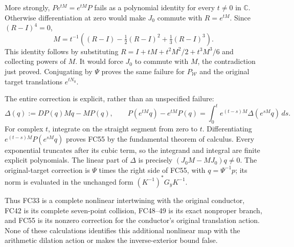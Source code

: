 \documentclass[11pt]{article}
\newcommand{\C}{\mathbb C}
\begin{document}
More strongly, $P e^{tM}=e^{tM}P$ fails as a polynomial identity
for every $t\ne0$ in $\C$. Otherwise differentiation at zero
would make $J_0$ commute with $R=e^{tM}$. Since $(R-I)^4=0$,
\[
 M=t^{-1}\left((R-I)-\tfrac12(R-I)^2+\tfrac13(R-I)^3\right).
\]
This identity follows by substituting
$R=I+tM+t^2M^2/2+t^3M^3/6$ and collecting powers of $M$.
It would force $J_0$ to commute with $M$, the contradiction just
proved. Conjugating by $\Psi$ proves the same failure for
$P_{\mathcal W}$ and the original target translations $e^{tN_0}$.

The entire correction is explicit, rather than an unspecified failure:
\[
 \Delta(q):=DP(q)Mq-MP(q),\qquad
 P(e^{tM}q)-e^{tM}P(q)
 =\int_0^t e^{(t-s)M}\Delta(e^{sM}q)\,ds.
 \tag{FC55}
\]
For complex $t$, integrate on the straight segment from zero to $t$.
Differentiating $e^{(t-s)M}P(e^{sM}q)$ proves FC55 by the
fundamental theorem of calculus. Every exponential truncates after
its cubic term, so the integrand and integral are finite explicit
polynomials. The linear part of $\Delta$ is precisely
$(J_0M-MJ_0)q\ne0$. The original-target correction is
$\Psi$ times the right side of FC55, with $q=\Psi^{-1}p$;
its norm is evaluated in the unchanged form
$(K^{-1})^*G_yK^{-1}$.

Thus FC33 is a complete nonlinear intertwining with the original
conductor, FC42 is its complete seven-point collision, FC48--49
is its exact nonproper branch, and FC55 is its nonzero correction
for the conductor's original translation action. None of these
calculations identifies this additional nonlinear map with the
arithmetic dilation action or makes the inverse-exterior bound false.

\end{document}
